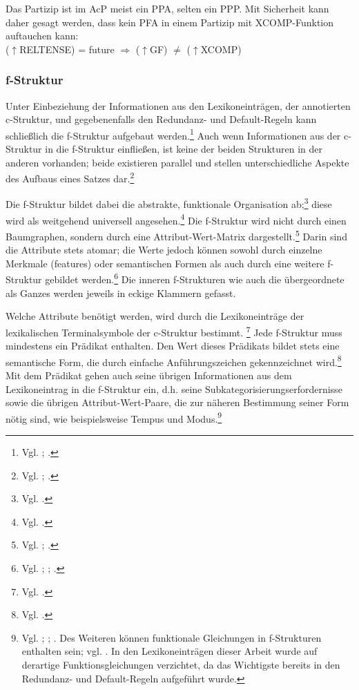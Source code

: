 \documentclass[12pt,a4paper]{article}
\begin{document}
Das Partizip ist im AcP meist ein PPA, selten ein PPP. Mit Sicherheit kann daher gesagt werden, dass kein PFA in einem Partizip mit XCOMP-Funktion auftauchen kann: \\
($\uparrow$RELTENSE) = future $\Rightarrow$ ($\uparrow$GF) $\neq$ ($\uparrow$XCOMP)




\subsubsection{f-Struktur}
Unter Einbeziehung der Informationen aus den Lexikoneinträgen, der annotierten c-Struktur, und gegebenenfalls den Redundanz- und Default-Regeln kann schließlich die f-Struktur aufgebaut werden.\footnote{Vgl. \cite[13; 23]{Rohrer}; \cite[14]{Skript}.} Auch wenn Informationen aus der c-Struktur in die f-Struktur einfließen, ist keine der beiden Strukturen in der anderen vorhanden; beide existieren parallel und stellen unterschiedliche Aspekte des Aufbaus eines Satzes dar.\footnote{Vgl. \cite[26-7; 35]{Rohrer}; \cite[8]{Skript}.}

Die f-Struktur bildet dabei die abstrakte, funktionale Organisation ab;\footnote{Vgl. \cite[7]{Dal}.} diese wird als weitgehend universell angesehen.\footnote{Vgl. \cite[7; 9]{Bresnan}.} Die f-Struktur wird nicht durch einen Baumgraphen, sondern durch eine Attribut-Wert-Matrix dargestellt.\footnote{Vgl. \cite[55]{Falk}; \cite[7]{Skript}.} Darin sind die Attribute stets atomar; die Werte jedoch können sowohl durch einzelne Merkmale (features) oder semantischen Formen als auch durch eine weitere f-Struktur gebildet werden.\footnote{Vgl. \cite[55]{Falk}; \cite[13]{Rohrer}; \cite[8]{Skript}.} Die inneren f-Strukturen wie auch die übergeordnete als Ganzes werden jeweils in eckige Klammern gefasst.

Welche Attribute benötigt werden, wird durch die Lexikoneinträge der lexikalischen Terminalsymbole der c-Struktur bestimmt. \footnote{Vgl. \cite[13; 23]{Rohrer}.} Jede f-Struktur muss mindestens ein Prädikat enthalten. Den Wert dieses Prädikats bildet stets eine semantische Form, die durch einfache Anführungszeichen gekennzeichnet wird.\footnote{Vgl. \cite[8]{Skript}.} Mit dem Prädikat gehen auch seine übrigen Informationen aus dem Lexikoneintrag in die f-Struktur ein, d.h. seine Subkategorisierungserfordernisse sowie die übrigen Attribut-Wert-Paare, die zur näheren Bestimmung seiner Form nötig sind, wie beispielsweise Tempus und Modus.\footnote{Vgl. \cite[23; 28-9]{Rohrer}; \cite[7; 9]{Skript}; \cite[7]{Dal}. Des Weiteren können funktionale Gleichungen in f-Strukturen enthalten sein; vgl. \cite[21]{Rohrer}. In den Lexikoneinträgen dieser Arbeit wurde auf derartige Funktionsgleichungen verzichtet, da das Wichtigste bereits in den Redundanz- und Default-Regeln aufgeführt wurde.} 
\end{document}
